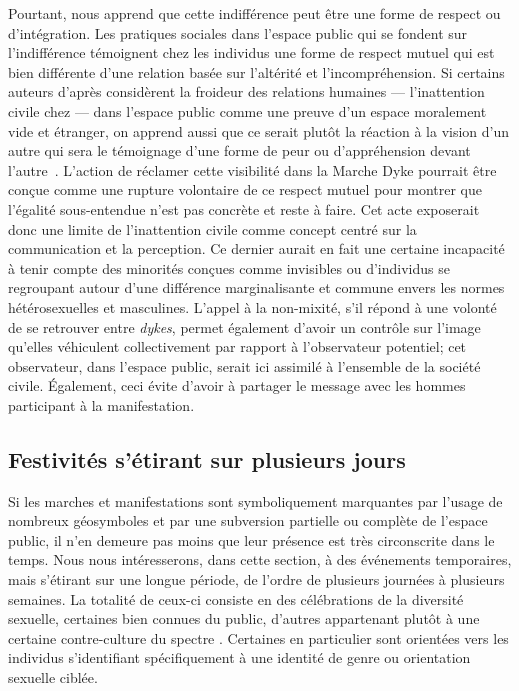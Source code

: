Pourtant, \citeauthor{Frosh2006} nous apprend que cette indifférence peut être une forme de respect ou d'intégration.
Les pratiques sociales dans l'espace public qui se fondent sur l'indifférence témoignent chez les individus une forme de respect mutuel qui est bien différente d'une relation basée sur l'altérité et l'incompréhension.
Si certains auteurs d'après \citeauthor{Frosh2006} considèrent la froideur des relations humaines --- l'inattention civile chez \citeauthor{Goffman1956} --- dans l'espace public comme une preuve d'un espace moralement vide et étranger, on apprend aussi que ce serait plutôt la réaction à la vision d'un autre qui sera le témoignage d'une forme de peur ou d'appréhension devant l'autre~\citep[279--280]{Frosh2006}.
L'action de réclamer cette visibilité dans la Marche Dyke pourrait être conçue comme une rupture volontaire de ce respect mutuel pour montrer que l'égalité sous-entendue n'est pas concrète et reste à faire.
Cet acte exposerait donc une limite de l'inattention civile comme concept centré sur la communication et la perception.
Ce dernier aurait en fait une certaine incapacité à tenir compte des minorités conçues comme invisibles ou d'individus se regroupant autour d'une différence marginalisante et commune envers les normes hétérosexuelles et masculines.
L'appel à la non-mixité, s'il répond à une volonté de se retrouver entre \emph{dykes}, permet également d'avoir un contrôle sur l'image qu'elles véhiculent collectivement par rapport à l'observateur potentiel; cet observateur, dans l'espace public, serait ici assimilé à l'ensemble de la société civile.
Également, ceci évite d'avoir à partager le message avec les hommes participant à la manifestation.


\subsection{Festivités s'étirant sur plusieurs jours}
\label{sec:festivitesplusieursjours}
Si les marches et manifestations sont symboliquement marquantes par l'usage de nombreux géosymboles et par une subversion partielle ou complète de l'espace public, il n’en demeure pas moins que leur présence est très circonscrite dans le temps.
Nous nous intéresserons, dans cette section, à des événements temporaires, mais s'étirant sur une longue période, de l'ordre de plusieurs journées à plusieurs semaines.
La totalité de ceux-ci consiste en des célébrations de la diversité sexuelle, certaines bien connues du public, d'autres appartenant plutôt à une certaine contre-culture du spectre \lgbt.
Certaines en particulier sont orientées vers les individus s'identifiant spécifiquement à une identité de genre ou orientation sexuelle ciblée.


